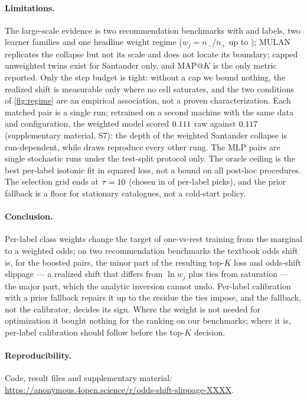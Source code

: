 \documentclass[runningheads]{llncs}
\makeatletter
\newcommand{\mapk}{\mathrm{MAP}@K\xspace}
\newcommand{\Supp}[1]{supplementary material, #1}  %
\newcommand{\anonurl}{https://anonymous.4open.science/r/odds-shift-slippage-XXXX}  %
\makeatother
\begin{document}
\paragraph{Limitations.} The large-scale evidence is two recommendation benchmarks with \nnLabels{} and \nInLabels{} labels, two learner families and one headline weight regime ($w_j=n_-/n_+$ up to \nwMax); MULAN replicates the collapse but not its scale and does not locate its boundary; capped unweighted twins exist for Santander only, and $\mapk$ is the only metric reported. Only the step budget is tight: without a cap we bound nothing, the realized shift is measurable only where no cell saturates, and the two conditions of \cref{fig:regime} are an empirical association, not a proven characterization. Each matched pair is a single run; retrained on a second machine with the same data and configuration, the weighted model scored $0.111$ raw against $0.117$ (\Supp{S7}): the depth of the weighted Santander collapse is run-dependent, while \nseedN{} draws reproduce every other rung. The MLP pairs are single stochastic runs under the test-split protocol only. The oracle ceiling is the best per-label isotonic fit in squared loss, not a bound on all post-hoc procedures. The selection grid ends at $\tau=10$ (chosen in \nnTauChoiceMaxTau{} of \nnTauChoicePerLabel{} per-label picks), and the prior fallback is a floor for stationary catalogues, not a cold-start policy.

\paragraph{Conclusion.} Per-label class weights change the target of one-vs-rest training from the marginal to a weighted odds; on two recommendation benchmarks the textbook odds shift is, for the boosted pairs, the minor part of the resulting top-$K$ loss and odds-shift slippage --- a realized shift that differs from $\ln w_j$ plus ties from saturation --- the major part, which the analytic inversion cannot undo. Per-label calibration with a prior fallback repairs it up to the residue the ties impose, and the fallback, not the calibrator, decides its sign. Where the weight is not needed for optimization it bought nothing for the ranking on our benchmarks; where it is, per-label calibration should follow before the top-$K$ decision.

\paragraph{Reproducibility.} Code, result files and supplementary material: \url{\anonurl}.



\end{document}
